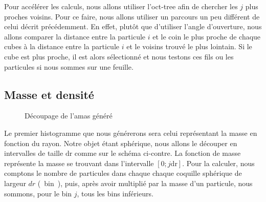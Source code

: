 			Pour accélérer les calculs, nous allons utiliser l'oct-tree afin de chercher les $j$ plus
			proches voisins. Pour ce faire, nous allons utiliser un parcours un peu différent de celui
			décrit précédemment. En effet, plutôt que d'utiliser l'angle d'ouverture, nous allons comparer
			la distance entre la particule $i$ et le coin le plus proche de chaque cubes à la distance entre
			la particule $i$ et le voisins trouvé le plus lointain. Si le cube est plus proche, il est alors
			sélectionné et nous testons ces fils ou les particules si nous sommes sur une feuille.

		\subsection{Masse et densité}

			\begin{wrapfigure}{l}{0.40\textwidth}
				\begin{center}
				\end{center}
				\caption{Découpage de l'amas généré\label{schema::bin}}
			\end{wrapfigure}
			Le premier histogramme que nous générerons sera celui
			représentant la masse en fonction du rayon. Notre objet
			étant sphérique, nous allons le découper en intervalles
			de taille $\mathrm{dr}$ comme sur le schéma ci-contre.
			La fonction de masse représente la masse se trouvant
			dans l'intervalle \mbox{$\left[0; j
			\mathrm{dr}\right]$}. Pour la calculer, nous comptons
			le nombre de particules dans chaque chaque coquille
			sphérique de largeur $dr$ (~bin~), puis, après avoir
			multiplié par la masse d'un particule, nous sommons,
			pour le bin $j$, tous les bins inférieurs.

